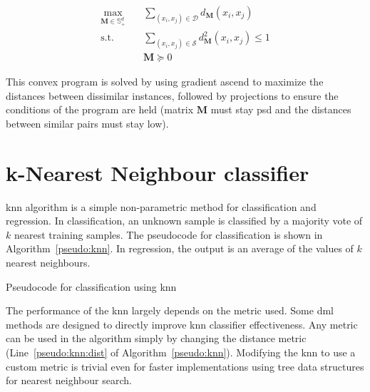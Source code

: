 \documentclass[12pt,a4paper]{report}
\begin{document}
\begin{align*}
\max_{\bm{M} \in \mathbb{S}^{d}_+} \quad & \sum_{(x_i,x_j)\in \mathcal{D}} d_{\bm{M}}(x_i,x_j) \\
\text{s.t.} \quad & \sum_{(x_i,x_j)\in \mathcal{S}} d_{\bm{M}}^2(x_i,x_j) \leq 1 \\
& \bm{M} \succeq 0
\end{align*}

This convex program is solved by using gradient ascend to maximize the distances between dissimilar instances, followed by projections to ensure the conditions of the program are held (matrix $\bm{M}$ must stay \ac{psd} and the distances between similar pairs must stay low).

\section{k-Nearest Neighbour classifier} \label{alg:knn}

\ac{knn} algorithm is a simple non-parametric method for classification and regression. In classification, an unknown sample is classified by a majority vote of $k$ nearest training samples. The pseudocode for classification is shown in Algorithm~\ref{pseudo:knn}. In regression, the output is an average of the values of $k$ nearest neighbours.

\begin{algorithm}[t]
\caption{Pseudocode for classification using \ac{knn}} \label{pseudo:knn}
\DontPrintSemicolon
\LinesNumbered
{}
\end{algorithm} 

The performance of the \ac{knn} largely depends on the metric used. Some \ac{dml} methods are designed to directly improve \ac{knn} classifier effectiveness. Any metric can be used in the algorithm simply by changing the distance metric (Line~\ref{pseudo:knn:dist} of Algorithm~\ref{pseudo:knn}). Modifying the \ac{knn} to use a custom metric is trivial even for faster implementations using tree data structures for nearest neighbour search.
\end{document}

